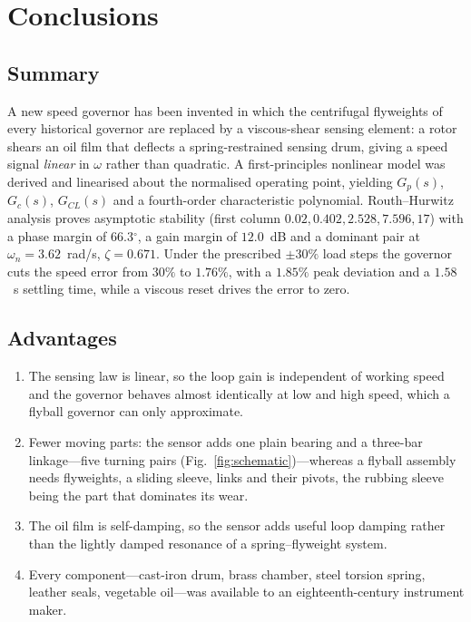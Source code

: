 \documentclass[conference]{IEEEtran}
\newcommand{\dg}{\ensuremath{^{\circ}}}
\begin{document}
\section{Conclusions}\label{sec:conclusions}
\subsection{Summary}
A new speed governor has been invented in which the centrifugal flyweights of every
historical governor are replaced by a viscous-shear sensing element: a rotor shears
an oil film that deflects a spring-restrained sensing drum, giving a speed signal
\emph{linear} in $\omega$ rather than quadratic. A first-principles nonlinear model
was derived and linearised about the normalised operating point, yielding $G_p(s)$,
$G_c(s)$, $G_{CL}(s)$ and a fourth-order characteristic polynomial. Routh--Hurwitz
analysis proves asymptotic stability (first column $0.02,0.402,2.528,7.596,17$) with
a phase margin of $66.3\dg$, a gain margin of $12.0$~dB and a dominant pair at
$\omega_n=3.62$~rad/s, $\zeta=0.671$. Under the prescribed $\pm30\%$ load steps the
governor cuts the speed error from $30\%$ to $1.76\%$, with a $1.85\%$ peak deviation
and a $1.58$~s settling time, while a viscous reset drives the error to zero.

\subsection{Advantages}
\begin{enumerate}
\item The sensing law is linear, so the loop gain is independent of working speed
and the governor behaves almost identically at low and high speed, which a flyball
governor can only approximate.
\item Fewer moving parts: the sensor adds one plain bearing and a three-bar
linkage---five turning pairs (Fig.~\ref{fig:schematic})---whereas a flyball assembly
needs flyweights, a sliding sleeve, links and their pivots, the rubbing sleeve being
the part that dominates its wear.
\item The oil film is self-damping, so the sensor adds useful loop damping rather
than the lightly damped resonance of a spring--flyweight system.
\item Every component---cast-iron drum, brass chamber, steel torsion spring, leather
seals, vegetable oil---was available to an eighteenth-century instrument maker.
\end{enumerate}
\end{document}
